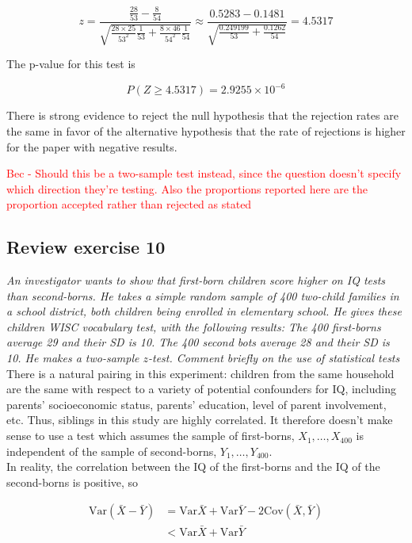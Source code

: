 \documentclass[11pt]{article}
\newcommand{\pr}{P} %
\newcommand{\var}{\textrm{Var}}
\newcommand{\cov}{\textrm{Cov}}
\begin{document}
$$z = \frac{\frac{28}{53} - \frac{8}{54}}{\sqrt{ \frac{28\times25}{53^2}\frac{1}{53} + \frac{8\times46}{54^2}\frac{1}{54}}} \approx \frac{ 0.5283 - 0.1481}{\sqrt{ \frac{ 0.249199}{53} + \frac{ 0.1262}{54}}} = 4.5317$$

The p-value for this test is

$$\pr(Z \geq 4.5317) = 2.9255 \times 10^{-6}$$

There is strong evidence to reject the null hypothesis that the rejection rates are the same in favor of the alternative hypothesis that the rate of rejections is higher for the paper with negative results.

\textcolor{red}{Bec - Should this be a two-sample test instead, since the question doesn't specify which direction they're testing. Also the proportions reported here are  the proportion accepted rather than rejected as stated}



\subsection*{Review exercise 10} %
\noindent \textit{An investigator wants to show that first-born children score higher on IQ tests than second-borns. He takes a simple random sample of 400 two-child families in a school district, both children being enrolled in elementary school. He gives these children WISC vocabulary test, with the following results: The 400 first-borns average 29 and their SD is 10. The 400 second bots average 28 and their SD is 10. He makes a two-sample $z$-test. Comment briefly on the use of statistical tests}\\

There is a natural pairing in this experiment: children from the same household are the same with respect to a variety of potential confounders for IQ, including parents' socioeconomic status, parents' education, level of parent involvement, etc.  Thus, siblings in this study are highly correlated.  It therefore doesn't make sense to use a test which assumes the sample of first-borns, $X_1, \dots, X_{400}$ is independent of the sample of second-borns, $Y_1, \dots, Y_{400}$.  \\

In reality, the correlation between the IQ of the first-borns and the IQ of the second-borns is positive, so

\begin{align*}
\var(\bar{X} - \bar{Y}) &= \var{\bar{X}} + \var{\bar{Y}} - 2\cov(\bar{X},\bar{Y}) \\
&< \var{\bar{X}} + \var{\bar{Y}} 
\end{align*}
\end{document}
